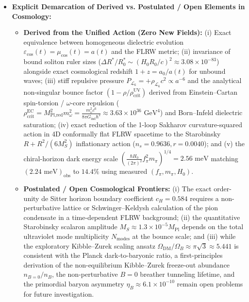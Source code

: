 \documentclass[10pt,aps,prd,twocolumn,superscriptaddress,nofootinbib,floatfix,longbibliography,showkeys]{revtex4-2}
\begin{document}
\begin{itemize}
  \item \textbf{Explicit Demarcation of Derived vs. Postulated / Open Elements in Cosmology:}
  \begin{itemize}
    \item \textbf{Derived from the Unified Action (Zero New Fields):} (i) Exact equivalence between homogeneous dielectric evolution $\varepsilon_{\text{cos}}(t)=\mu_{\text{cos}}(t)=a(t)$ and the FLRW metric; (ii) invariance of bound soliton ruler sizes ($\Delta R^*/R^*_0 \sim (H_0 R_0/c)^2 \approx 3.08 \times 10^{-83}$) alongside exact cosmological redshift $1+z = a_0/a(t)$ for unbound waves; (iii) stiff repulsive pressure $P_{\mathcal{L}_6} = +\rho_{\mathcal{L}_6} c^2 \propto a^{-6}$ and the analytical non-singular bounce factor $(1 - \rho/\rho_{\text{crit}}^{\text{UV}})$ derived from Einstein--Cartan spin-torsion / $\omega$-core repulsion ($\rho_{\text{crit}}^{\text{EC}} = M_{\text{Pl,red}}^2 m_\omega^2 = \frac{m_\omega^2 c^6}{8\pi G_{\text{ind}}\hbar^2} \approx 3.63 \times 10^{36}\text{ GeV}^4$) and Born--Infeld dielectric saturation; (iv) exact reduction of the 1-loop Sakharov curvature-squared action in 4D conformally flat FLRW spacetime to the Starobinsky $R + R^2/(6M_S^2)$ inflationary action ($n_s = 0.9636, r = 0.0040$); and (v) the chiral-horizon dark energy scale $\left(\frac{\hbar H_0}{(2\pi)^2}f_\pi^2 m_\pi\right)^{1/4} = 2.56\text{ meV}$ matching $(2.24\text{ meV})_{\text{obs}}$ to $14.4\%$ using measured $(f_\pi, m_\pi, H_0)$.
    \item \textbf{Postulated / Open Cosmological Frontiers:} (i) The exact order-unity de Sitter horizon boundary coefficient $c_H = 0.584$ requires a non-perturbative lattice or Schwinger--Keldysh calculation of the pion condensate in a time-dependent FLRW background; (ii) the quantitative Starobinsky scalaron amplitude $M_S \approx 1.3 \times 10^{-5} M_{\text{Pl}}$ depends on the total ultraviolet mode multiplicity $N_{\text{modes}}$ at the bounce scale; and (iii) while the exploratory Kibble--Zurek scaling ansatz $\Omega_{\text{DM}}/\Omega_B \approx \pi\sqrt{3} \approx 5.441$ is consistent with the Planck dark-to-baryonic ratio, a first-principles derivation of the non-equilibrium Kibble--Zurek freeze-out abundance $n_{B=0}/n_B$, the non-perturbative $B=0$ breather tunneling lifetime, and the primordial baryon asymmetry $\eta_B \approx 6.1 \times 10^{-10}$ remain open problems for future investigation.

  \end{itemize}
\end{itemize}
\end{document}
